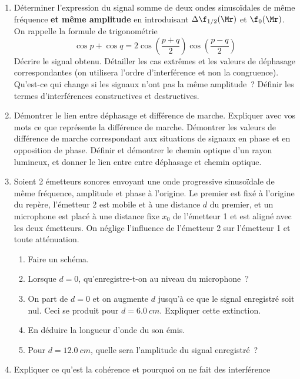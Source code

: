 \documentclass[a4paper, 12pt, final, garamond]{book}
\begin{document}
\begin{enumerate}[resume]
	\item Déterminer l'expression du signal somme de deux ondes sinusoïdales de
	      même fréquence \textbf{et même amplitude} en introduisant $\Delta
		      \f_{1/2}(\Mr)$ et $\f_0(\Mr)$. On rappelle la formule de trigonométrie
	      \[
		      \cos p + \cos q =
		      2\cos \left( \frac{p+q}{2} \right)\cos \left( \frac{p-q}{2} \right)
	      \]
	      Décrire le signal obtenu. Détailler les
	      cas extrêmes et les valeurs de déphasage correspondantes (on utilisera
	      l'ordre d'interférence et non la congruence). Qu'est-ce qui change si
	      les signaux n'ont pas la même amplitude~? Définir les termes
	      d'interférences constructives et destructives.
	\item Démontrer le lien entre déphasage et différence de marche. Expliquer
	      avec vos mots ce que représente la différence de marche. Démontrer les
	      valeurs de différence de marche correspondant aux situations de signaux en
	      phase et en opposition de phase. Définir et démontrer le chemin optique
	      d'un rayon lumineux, et donner le lien entre entre déphasage et chemin
	      optique.
	\item
	      Soient 2 émetteurs sonores envoyant une onde progressive sinusoïdale de
	      même fréquence, amplitude et phase à l'origine. Le premier est fixé à
	      l'origine du repère, l'émetteur 2 est mobile et à une distance $d$ du
	      premier, et un microphone est placé à une distance fixe $x_0$ de
	      l'émetteur 1 et est aligné avec les deux émetteurs. On néglige
	      l'influence de l'émetteur 2 sur l'émetteur 1 et toute atténuation.
	      \begin{enumerate}[label=\sqenumi]
		      \item Faire un schéma.
		      \item Lorsque $d=0$, qu'enregistre-t-on au niveau du microphone~?
		      \item On part de $d=0$ et on augmente $d$ jusqu'à ce que le signal
		            enregistré soit nul. Ceci se produit pour $d = \SI{6.0}{cm}$.
		            Expliquer cette extinction.
		      \item En déduire la longueur d'onde du son émis.
		      \item Pour $d = \SI{12.0}{cm}$, quelle sera l'amplitude du signal
		            enregistré~?
	      \end{enumerate}
	\item Expliquer ce qu'est la cohérence et pourquoi on ne fait des interférence

\end{enumerate}
\end{document}
